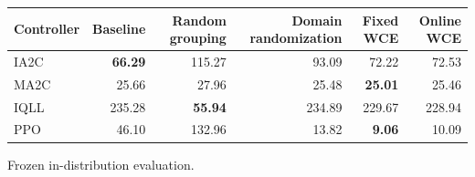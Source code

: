 \begin{tabular}{lrrrrr}
\hline
Controller & Baseline & Random grouping & Domain randomization & Fixed WCE & Online WCE \\
\hline
IA2C & \textbf{66.29} & 115.27 & 93.09 & 72.22 & 72.53 \\
MA2C & 25.66 & 27.96 & 25.48 & \textbf{25.01} & 25.46 \\
IQLL & 235.28 & \textbf{55.94} & 234.89 & 229.67 & 228.94 \\
PPO & 46.10 & 132.96 & 13.82 & \textbf{9.06} & 10.09 \\
\hline
\end{tabular}
Frozen in-distribution evaluation.
